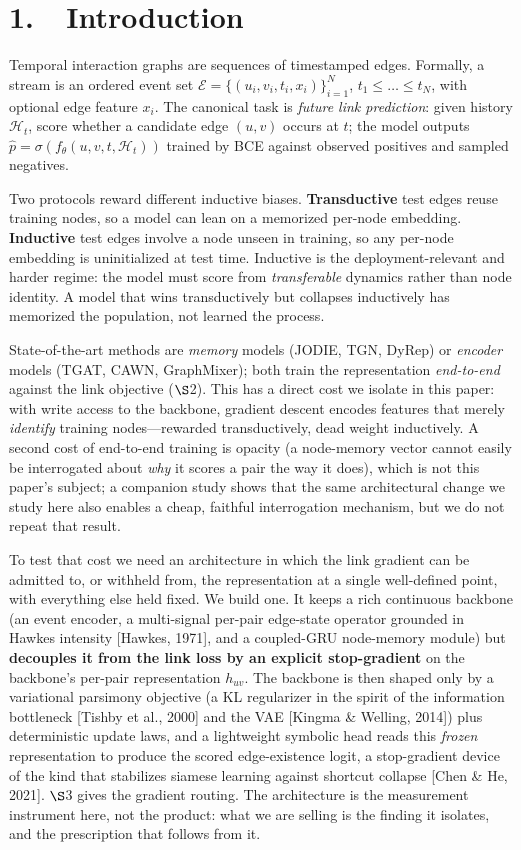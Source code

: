 \documentclass[conference]{IEEEtran}
\begin{document}
\section*{1.~~Introduction}

Temporal interaction graphs are sequences of timestamped edges. Formally, a stream is an ordered event set \(\mathcal{E} = \{(u_i, v_i, t_i, x_i)\}_{i=1}^{N}\), \(t_1 \le \dots \le t_N\), with optional edge feature \(x_i\). The canonical task is \emph{future link prediction}: given history \(\mathcal{H}_t\), score whether a candidate edge \((u, v)\) occurs at \(t\); the model outputs \(\hat{p} = \sigma(f_\theta(u, v, t, \mathcal{H}_t))\) trained by BCE against observed positives and sampled negatives.

Two protocols reward different inductive biases. \textbf{Transductive} test edges reuse training nodes, so a model can lean on a memorized per-node embedding. \textbf{Inductive} test edges involve a node unseen in training, so any per-node embedding is uninitialized at test time. Inductive is the deployment-relevant and harder regime: the model must score from \emph{transferable} dynamics rather than node identity. A model that wins transductively but collapses inductively has memorized the population, not learned the process.

State-of-the-art methods are \emph{memory} models (JODIE, TGN, DyRep) or \emph{encoder} models (TGAT, CAWN, GraphMixer); both train the representation \emph{end-to-end} against the link objective ($\S$2). This has a direct cost we isolate in this paper: with write access to the backbone, gradient descent encodes features that merely \emph{identify} training nodes---rewarded transductively, dead weight inductively. A second cost of end-to-end training is opacity (a node-memory vector cannot easily be interrogated about \emph{why} it scores a pair the way it does), which is not this paper's subject; a companion study shows that the same architectural change we study here also enables a cheap, faithful interrogation mechanism, but we do not repeat that result.

To test that cost we need an architecture in which the link gradient can be admitted to, or withheld from, the representation at a single well-defined point, with everything else held fixed. We build one. It keeps a rich continuous backbone (an event encoder, a multi-signal per-pair edge-state operator grounded in Hawkes intensity [Hawkes, 1971], and a coupled-GRU node-memory module) but \textbf{decouples it from the link loss by an explicit stop-gradient} on the backbone's per-pair representation \(h_{uv}\). The backbone is then shaped only by a variational parsimony objective (a KL regularizer in the spirit of the information bottleneck [Tishby et al., 2000] and the VAE [Kingma \& Welling, 2014]) plus deterministic update laws, and a lightweight symbolic head reads this \emph{frozen} representation to produce the scored edge-existence logit, a stop-gradient device of the kind that stabilizes siamese learning against shortcut collapse [Chen \& He, 2021]. $\S$3 gives the gradient routing. The architecture is the measurement instrument here, not the product: what we are selling is the finding it isolates, and the prescription that follows from it.
\end{document}
